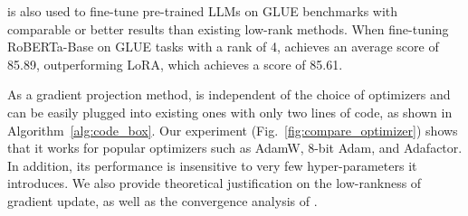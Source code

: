 \lowrank{} is also used to fine-tune pre-trained LLMs on GLUE benchmarks with comparable or better results than existing low-rank methods. 
When fine-tuning RoBERTa-Base on GLUE tasks with a rank of 4, \lowrank{} achieves an average score of 85.89, outperforming LoRA, which achieves a score of 85.61.

As a gradient projection method, \lowrank{} is independent of the choice of optimizers and can be easily plugged into existing ones with only two lines of code, as shown in Algorithm~\ref{alg:code_box}. Our experiment (Fig.~\ref{fig:compare_optimizer}) shows that it works for popular optimizers such as AdamW, 8-bit Adam, and Adafactor. In addition, its performance is insensitive to very few hyper-parameters it introduces. We also provide theoretical justification on the low-rankness of gradient update, as well as the convergence analysis of \lowrank. 






















